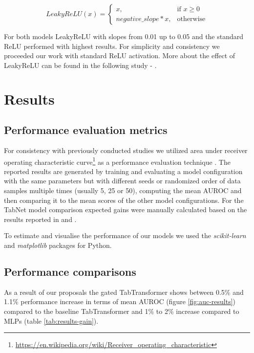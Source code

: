 \documentclass{article}
\begin{document}
\begin{equation}
    LeakyReLU(x)= 
    \begin{cases}
        x,& \text{if } x\geq 0\\
        negative\_slope * x,              & \text{otherwise}
    \end{cases}
\end{equation}

For both models LeakyReLU with slopes from 0.01 up to 0.05 and the standard ReLU performed with highest results. For simplicity and consistency we proceeded our work with standard ReLU activation. More about the effect of LeakyReLU can be found in the following study - \cite{fiedler2021simple}.

\section{Results}
\label{sec:results}

\subsection{Performance evaluation metrics}

For consistency with previously conducted studies we utilized area under receiver operating characteristic curve\footnote{\url{https://en.wikipedia.org/wiki/Receiver_operating_characteristic}} as a performance evaluation technique \cite{bradley1997use}. The reported results are generated by training and evaluating a model configuration with the same parameters but with different seeds or randomized order of data samples multiple times (usually 5, 25 or 50), computing the mean AUROC and then comparing it to the mean scores of the other model configurations. For the TabNet model comparison expected gains were manually calculated based on the results reported in \cite{Huang2020TabTransformerTD} and \cite{fiedler2021simple}.

To estimate and visualise the performance of our models we used the \textit{scikit-learn} \cite{scikit-learn} and \textit{matplotlib} \cite{Hunter:2007} packages for Python.

\subsection{Performance comparisons}

As a result of our proposals the gated TabTransformer shows between 0.5\% and 1.1\% performance increase in terms of mean AUROC (figure \ref{fig:auc-results}) compared to the baseline TabTransformer and 1\% to 2\% increase compared to MLPs (table \ref{tab:results-gain}).
\end{document}
